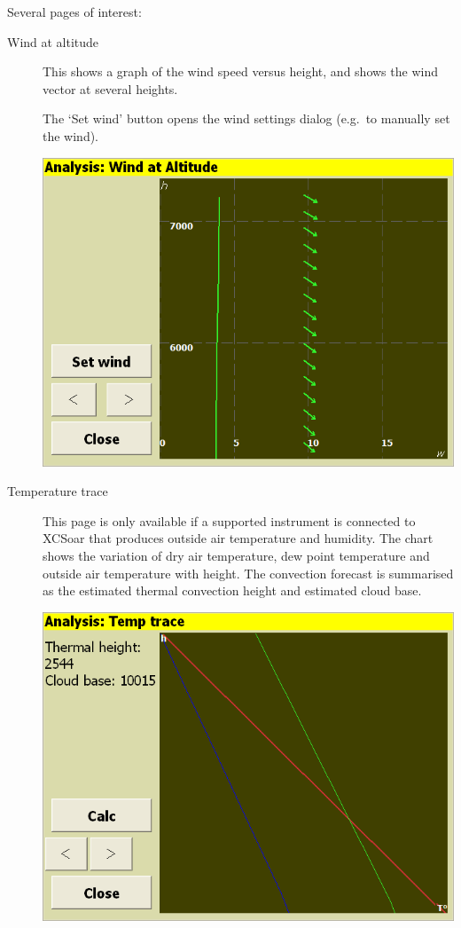 \documentclass[a4paper,12pt]{refrep}
\begin{document}
Several pages of interest:
\begin{description}

\item[Wind at altitude]
  This shows a graph of the wind speed versus height, and shows the
  wind vector at several heights.

The `Set wind' button opens the wind settings dialog (e.g.\ to
manually set the wind).

\begin{center}
\includegraphics[angle=0,width=\linewidth,keepaspectratio='true']{figures/analysis-wind.png}
\end{center}

\item[Temperature trace]
  This page is only available if a supported instrument is connected
  to XCSoar that produces outside air temperature and humidity.  The
  chart shows the variation of dry air temperature, dew point
  temperature and outside air temperature with height.  The convection
  forecast is summarised as the estimated thermal convection height
  and estimated cloud base.

\begin{center}
\includegraphics[angle=0,width=\linewidth,keepaspectratio='true']{figures/analysis-temptrace.png}
\end{center}

\end{description}
\end{document}
